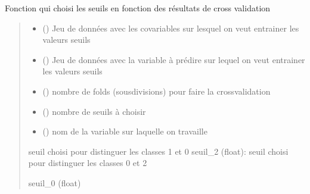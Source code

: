 \documentclass[letterpaper,10pt,french]{sphinxmanual}
\begin{document}
\begin{fulllineitems}
\label{\detokenize{methode_fait_maison:methode_fait_maison.choix_seuils}}
\pysigstartsignatures
{}
\pysigstopsignatures
\sphinxAtStartPar
Fonction qui choisi les seuils en fonction des résultats de cross validation
\begin{quote}\begin{description}
\begin{itemize}
\item {} 
\sphinxAtStartPar
{} () \textendash{} Jeu de données avec les co\sphinxhyphen{}variables sur lesquel on veut entrainer les valeurs seuils

\item {} 
\sphinxAtStartPar
{} () \textendash{} Jeu de données avec la variable à prédire sur lequel on veut entrainer les valeurs seuils

\item {} 
\sphinxAtStartPar
{} () \textendash{} nombre de folds (sous\sphinxhyphen{}divisions) pour faire la cross\sphinxhyphen{}validation

\item {} 
\sphinxAtStartPar
{} () \textendash{} nombre de seuils à choisir

\item {} 
\sphinxAtStartPar
{} () \textendash{} nom de la variable sur laquelle on travaille

\end{itemize}

\sphinxAtStartPar
seuil choisi pour distinguer les classes 1 et 0
seuil\_2 (float): seuil choisi pour distinguer les classes 0 et 2

\sphinxAtStartPar
seuil\_0 (float)

\end{description}\end{quote}

\end{fulllineitems}
\end{document}
